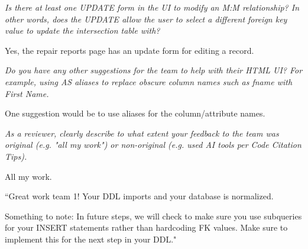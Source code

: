 \documentclass{article}
\begin{document}
\begin{tcolorbox}[colback=secondarycolor, colframe=primarycolor, title=\textbf{Step 3: Peer Review 4 - Daniel Guardado}]
\vspace{0.2cm}
\textit{Is there at least one UPDATE form in the UI to modify an M:M relationship? In other words, does the UPDATE allow the user to select a different foreign key value to update the intersection table with?}

\vspace{0.05cm}
Yes, the repair reports page has an update form for editing a record.

\vspace{0.2cm}
\textit{Do you have any other suggestions for the team to help with their HTML UI? For example, using AS aliases to replace obscure column names such as fname with First Name.}

\vspace{0.05cm}
One suggestion would be to use aliases for the column/attribute names.

\vspace{0.2cm}
\textit{As a reviewer, clearly describe to what extent your feedback to the team was original (e.g. "all my work") or non-original (e.g. used AI tools per Code Citation Tips). }

\vspace{0.05cm}
All my work.

\end{tcolorbox}

\vspace{0.2cm}


\begin{tcolorbox}[colback=secondarycolor, colframe=primarycolor, title=\textbf{Step 2: TA Review - Madelyn Lazar}]
``Great work team 1! Your DDL imports and your database is normalized. 

\vspace{0.2cm}
Something to note: In future steps, we will check to make sure you use subqueries for your INSERT statements rather than hardcoding FK values. Make sure to implement this for the next step in your DDL."
\end{tcolorbox}

\vspace{0.5cm}
\end{document}
